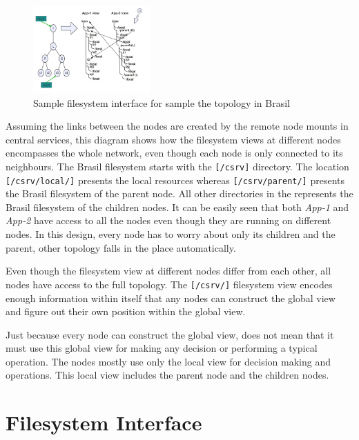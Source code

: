 \documentclass[conference]{sig-alternate}
\begin{document}
\begin{figure}[h]
  \begin{center}
    \leavevmode
      \includegraphics[height=0.3\textheight,width=0.4\textwidth]
		{./img/xcpu3FSTopo}
    \caption{Sample filesystem interface for sample the topology in Brasil}
    \label{fig:xcpu3FSTopo}
  \end{center}
\end{figure}

Assuming the links between the nodes are created by the remote node mounts in
central services, this diagram shows how the filesystem views at different
nodes encompasses the whole network, even though each node is only connected to
its neighbours. The Brasil filesystem starts with the \texttt{[/csrv]}
directory. The location \texttt{[/csrv/local/]} presents the local resources
whereas \texttt{[/csrv/parent/]} presents the Brasil filesystem of the parent
node. All other directories in the represents the Brasil filesystem of the
children nodes.  It can be easily seen that both \textit{App-1} and
\textit{App-2} have access to all the nodes even though they are running on
different nodes.  In this design, every node has to worry about only its
children and the parent, other topology falls in the place automatically.

Even though the filesystem view at different nodes differ from each other, 
all nodes have access to the full topology.  The \texttt{[/csrv/]} filesystem
view encodes enough information within itself that any nodes can construct the
global view and figure out their own position within the global view.

Just because every node can construct the global view, does not mean that it
must use this global view for making any decision or performing a typical
operation. The nodes mostly use only the local view for decision making and
operations. This local view includes the parent node and the children nodes.


\section{Filesystem Interface}
\end{document}
